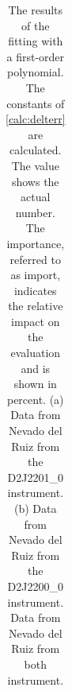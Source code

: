 \documentclass  [
  paper    = a4,
  BCOR     = 10mm,
  twoside,
  fontsize = 12pt,
  fleqn,
  toc      = bibnumbered,
  toc      = listofnumbered,
  numbers  = noendperiod,
  headings = normal,
  listof   = leveldown,
  version  = 3.03
]                                       {scrreprt}
\begin{document}
\begin{table}
{\begin{tabular}{cc}
			\bottomrule
	\end{tabular}}
	\label{tab:coefNevad}
	\caption{
		The results of the fitting with a first-order polynomial. 
		The constants of \cref{calc:delterr} are calculated.
		The value shows the actual number. The importance,  referred to as import, indicates the relative impact on the evaluation and is shown in percent.
		(a) Data from Nevado del Ruiz from the D2J2201\_0 instrument. 
		(b) Data from Nevado del Ruiz from the D2J2200\_0 instrument.  %
		Data from Nevado del Ruiz from both instrument. 
	}    
\end{table}    
\end{document}
